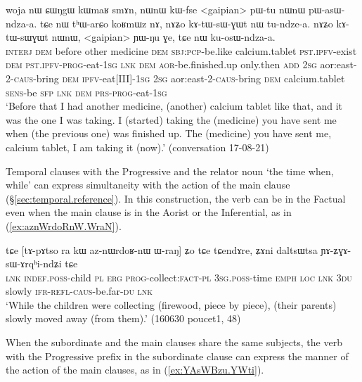 \begin{exe}
\ex \label{ex:pasWndzaa.kosWndzaa}
\gll woja nɯ ɕɯŋgɯ kɯmaʁ smɤn, nɯnɯ kɯ-fse <gaipian> pɯ-tu nɯnɯ pɯ-asɯ-ndza-a. tɕe nɯ tʰɯ-arɕo koʁmɯz nɤ, nɤʑo kɤ-tɯ-sɯ-ɣɯt nɯ tu-ndze-a. nɤʑo kɤ-tɯ-sɯɣɯt nɯnɯ, <gaipian> ɲɯ-ŋu ɣe, tɕe nɯ ku-osɯ-ndza-a. \\
\textsc{interj} \textsc{dem} before other medicine \textsc{dem} \textsc{sbj}:\textsc{pcp}-be.like calcium.tablet \textsc{pst}.\textsc{ipfv}-exist \textsc{dem} \textsc{pst}.\textsc{ipfv}-\textsc{prog}-eat-\textsc{1sg} \textsc{lnk} \textsc{dem} \textsc{aor}-be.finished.up only.then \textsc{add} \textsc{2sg} aor:east-2-\textsc{caus}-bring \textsc{dem} \textsc{ipfv}-eat[III]-\textsc{1sg}  \textsc{2sg} aor:east-2-\textsc{caus}-bring \textsc{dem} calcium.tablet \textsc{sens}-be \textsc{sfp} \textsc{lnk} \textsc{dem} \textsc{prs}-\textsc{prog}-eat-\textsc{1sg} \\
\glt `Before that I had another medicine, (another) calcium tablet like that, and it was the one I was taking. I (started) taking the (medicine) you have sent me when (the previous one) was finished up. The (medicine) you have sent me, calcium tablet, I am taking it (now).' (conversation 17-08-21)
\end{exe}

Temporal clauses with the Progressive and the relator noun  `the time when, while' can express simultaneity with the action of the main clause (§\ref{sec:temporal.reference}). In this construction, the verb can be in the Factual even when the main clause is in the Aorist or the Inferential, as in (\ref{ex:aznWrdoRnW.WraN}).

\begin{exe}
\ex \label{ex:aznWrdoRnW.WraN}
\gll tɕe [tɤ-pɤtso ra kɯ az-nɯrdoʁ-nɯ ɯ-raŋ] ʑo tɕe tɕendɤre, ʑɤni daltsɯtsa ɲɤ-ʑɣɤ-sɯ-ɤrqʰi-ndʑi tɕe \\
\textsc{lnk} \textsc{indef}.\textsc{poss}-child \textsc{pl} \textsc{erg} \textsc{prog}-collect:\textsc{fact}-\textsc{pl} \textsc{3sg}.\textsc{poss}-time \textsc{emph} \textsc{loc} \textsc{lnk} \textsc{3du} slowly \textsc{ifr}-\textsc{refl}-\textsc{caus}-be.far-\textsc{du} \textsc{lnk} \\
\glt `While the children were collecting (firewood, piece by piece), (their parents) slowly moved away (from them).' (160630 poucet1, 48)
\end{exe}

When the subordinate and the main clauses share the same subjects, the verb with the Progressive prefix in the subordinate clause can express the manner of the action of the main clauses, as in (\ref{ex:YAsWBzu.YWti}).

